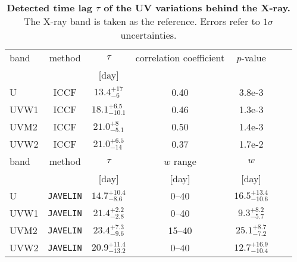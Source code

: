 \begin{table}
\renewcommand{\arraystretch}{1.5}
\centering
\caption{{\bf Detected time lag $\tau$ of the UV variations behind the X-ray.} The X-ray band is taken as the reference. Errors refer to $1\sigma$ uncertainties.}
\label{tab:tablelag}
\begin{tabular}{lcccccr}
\hline
\hline
 band & method & $\tau$ & correlation coefficient & $p$-value   \\ 
      &        &  [day] &                         &             \\ \hline
U     & ICCF &  $13.4 ^{+17}_{-6} $ & 0.40 & 3.8e-3  \\
UVW1  & ICCF &  $18.1 ^{+6.5}_{-10.1} $ & 0.46 & 1.3e-3 \\
UVM2  & ICCF &  $21.0 ^{+8}_{-5.1} $ & 0.50 & 1.4e-3 \\
UVW2  & ICCF &  $21.0 ^{+6.5}_{-14} $ & 0.37 & 1.7e-2 \\
\hline \hline
band & method & $\tau$ & $w$ range &  $w$  \\ 
     &        &  [day] & [day]  &    [day]  \\ \hline 
U     & \texttt{JAVELIN} &  $ 14.7^{+10.4}_{-8.6} $ & 0--40 & $16.5 ^{+13.4}_{-10.6} $ \\
UVW1  & \texttt{JAVELIN} &  $ 21.4 ^{+2.2}_{-2.8} $  & 0--40 & $9.3 ^{+8.2}_{-5.7} $  \\
UVM2  & \texttt{JAVELIN} &  $ 23.4^{+7.3}_{-9.6} $  & 15--40 &  $ 25.1^{+8.7}_{-7.2} $  \\
UVW2  & \texttt{JAVELIN} &  $ 20.9 ^{+11.4}_{-13.2} $  & 0--40&  $ 12.7 ^{+16.9}_{-10.4} $ \\
\hline \hline
\end{tabular}   
\end{table}


